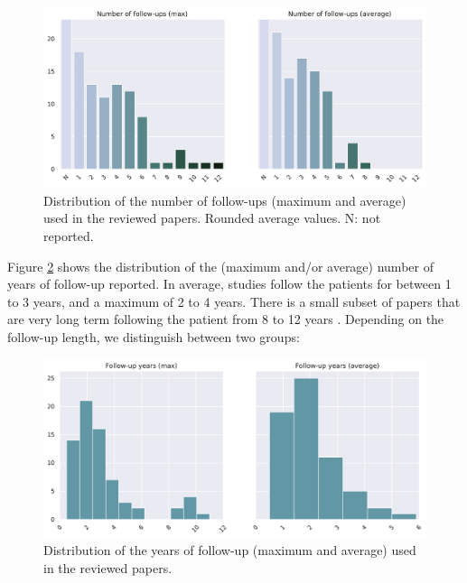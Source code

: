 \begin{figure}[!htbp]
\centering
\includegraphics[width=1.0\textwidth]{figures/review/Fig3.pdf}
    \caption[Distribution of the number of follow-ups used in the reviewed papers.]{Distribution of the number of follow-ups (maximum and average) used in the reviewed papers. Rounded average values. N: not reported.}\label{fig:followups}
\end{figure}

Figure \ref{fig:followups_years} shows the distribution of the (maximum and/or average) number of years of follow-up reported. In average, studies follow the patients for between 1 to 3 years, and a maximum of 2 to 4 years. There is a small subset of papers that are very long term following the patient from 8 to 12 years \cite{Ghazi2019,Chen2012,Li2017b,Li2017c,Bilgel2015a,Bilgel2016}. Depending on the follow-up length, we distinguish between two groups:

\begin{figure}[!htbp]
\centering
\includegraphics[width=1.0\textwidth]{figures/review/Fig4.pdf}
    \caption[Distribution of the years of follow-up used in the reviewed papers.]{Distribution of the years of follow-up (maximum and average) used in the reviewed papers.}\label{fig:followups_years}
\end{figure}

